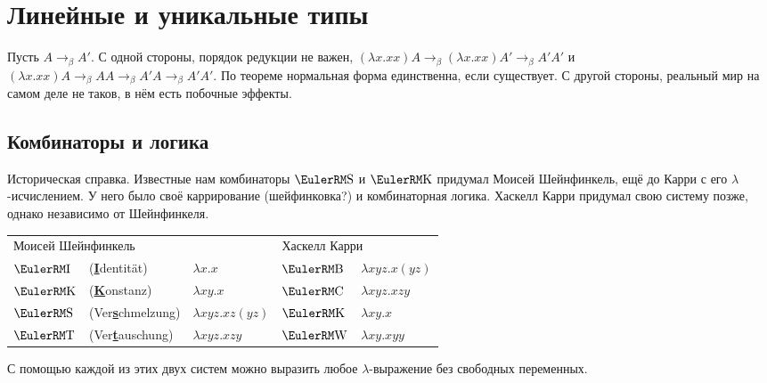 \section{\texorpdfstring{Линейные и уникальные типы}{Linear and unique types}}

Пусть $A \to_\beta A'$.
С одной стороны, порядок редукции не важен, %
$(\lambda x . x x) A \to_\beta (\lambda x . x x) A' \to_\beta A' A'$
и $(\lambda x . x x) A \to_\beta A A \to_\beta A' A \to_\beta A' A'$.
По теореме  нормальная форма единственна, если существует.
С другой стороны, реальный мир на самом деле не таков, в нём есть побочные эффекты.

\subsection{\texorpdfstring{Комбинаторы и логика}{Combinators and logic}}

Историческая справка. Известные нам комбинаторы $\comb S$ и $\comb K$ придумал Моисей Шейнфинкель,
ещё до Карри с его $\lambda$-исчислением.
У него было своё каррирование (шейфинковка?) и комбинаторная логика.
Хаскелл Карри придумал свою систему позже, однако независимо от Шейнфинкеля.

\begin{center} \newcommand{\eemph}[1]{\underline{\textbf{#1}}}
\begin{tabular}{l l l l l} \toprule
    \multicolumn{3}{l}{Моисей Шейнфинкель} & \multicolumn{2}{l}{Хаскелл Карри} \\ \cmidrule(lr){1-3} \cmidrule(lr){4-5}
    $\comb I$ & (\eemph{I}dentität)     & $\lambda x . x$             & $\comb B$ & $\lambda x y z . x (y z)$ \\
    $\comb K$ & (\eemph{K}onstanz)      & $\lambda x y . x$           & $\comb C$ & $\lambda x y z . x z y$   \\
    $\comb S$ & (Ver\eemph{s}chmelzung) & $\lambda x y z . x z (y z)$ & $\comb K$ & $\lambda x y . x$         \\
    $\comb T$ & (Ver\eemph{t}auschung)  & $\lambda x y z . x z y$     & $\comb W$ & $\lambda x y . x y y$ \\ \bottomrule
\end{tabular} %
\end{center}

С помощью каждой из этих двух систем можно выразить любое $\lambda$-выражение без свободных переменных.


